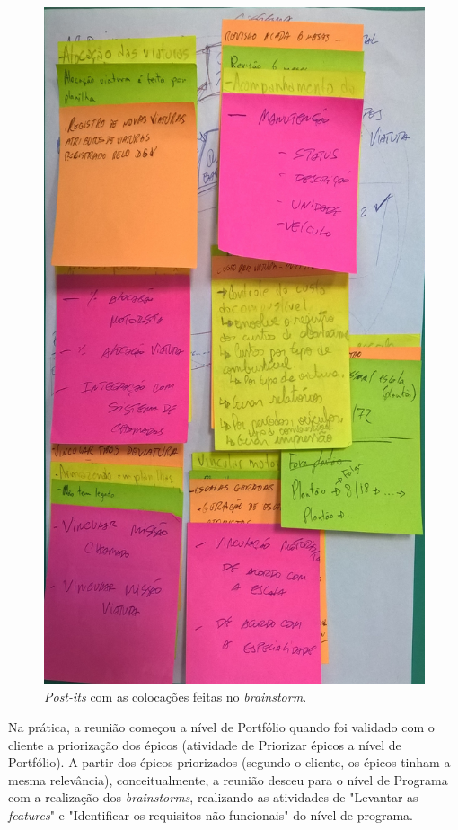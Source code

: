       \begin{figure}[!htbp]
	\centering
	\includegraphics[scale=0.11]{figuras/post_its_reuniao}
	\caption[\textit{Post-its} com as colocações feitas no \textit{brainstorm}]
	  {\textit{Post-its} com as colocações feitas no \textit{brainstorm}.}
	\label{post_its_reuniao}
      \end{figure}
      
      Na prática, a reunião começou a nível de Portfólio quando foi validado com o cliente a priorização dos épicos
      (atividade de Priorizar épicos a nível de Portfólio). A partir dos épicos priorizados (segundo o cliente, os épicos tinham a 
      mesma relevância), conceitualmente, a reunião desceu para o nível de Programa com a realização dos \textit{brainstorms},
      realizando as atividades de "Levantar as \textit{features}" e "Identificar os requisitos não-funcionais" do nível de programa.
      
